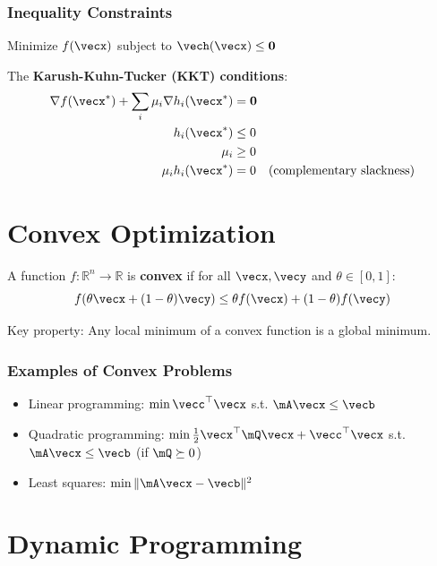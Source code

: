 \subsubsection{Inequality Constraints}
Minimize $f(\vecx)$ subject to $\vech(\vecx) \leq \mathbf{0}$

The \textbf{Karush-Kuhn-Tucker (KKT) conditions}:
\begin{align}
\nabla f(\vecx^*) + \sum_i \mu_i \nabla h_i(\vecx^*) &= \mathbf{0} \\
h_i(\vecx^*) &\leq 0 \\
\mu_i &\geq 0 \\
\mu_i h_i(\vecx^*) &= 0 \quad \text{(complementary slackness)}
\end{align}

\section{Convex Optimization}

\begin{definitionbox}[title=Definition 0.7: Convex Function]
A function $f: \mathbb{R}^n \to \mathbb{R}$ is \textbf{convex} if for all $\vecx, \vecy$ and $\theta \in [0,1]$:
\begin{equation}
f(\theta\vecx + (1-\theta)\vecy) \leq \theta f(\vecx) + (1-\theta)f(\vecy)
\end{equation}
\end{definitionbox}

Key property: Any local minimum of a convex function is a global minimum.

\subsubsection{Examples of Convex Problems}
\begin{itemize}
    \item Linear programming: $\min \vecc^\top\vecx$ s.t. $\mA\vecx \leq \vecb$
    \item Quadratic programming: $\min \frac{1}{2}\vecx^\top\mQ\vecx + \vecc^\top\vecx$ s.t. $\mA\vecx \leq \vecb$ (if $\mQ \succeq 0$)
    \item Least squares: $\min \|\mA\vecx - \vecb\|^2$
\end{itemize}

\section{Dynamic Programming}

